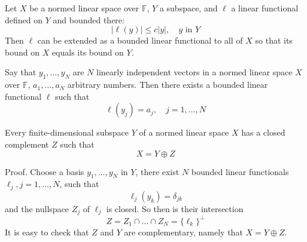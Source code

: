 \documentclass[12pt, oneside]{book}
\begin{document}
\begin{theorem}
    Let $X$ be a normed linear space over $\mathbb{F}$, $Y$ a subspace, and $\ell$ a linear functional defined on $Y$ and bounded there:
    \begin{equation*}
        |\ell(y)| \leq c|y|, \quad y \text { in } Y
    \end{equation*}
    Then $\ell$ can be extended as a bounded linear functional to all of $X$ so that its bound on $X$ equals its bound on $Y$.
\end{theorem}
\begin{theorem}
    Say that $y_1, \ldots, y_N$ are $N$ linearly independent vectors in a normed linear space $X$ over $\mathbb{F}$, $a_1, \ldots, a_N$ arbitrary numbers. Then there exists a bounded linear functional $\ell$ such that
    \begin{equation*}
        \ell\left(y_j\right)=a_j, \quad j=1, \ldots, N
    \end{equation*}
\end{theorem}
\begin{corollary}
    Every finite-dimensional subspace $Y$ of a normed linear space $X$ has a closed complement $Z$ such that
    \begin{equation*}
        X=Y \oplus Z
    \end{equation*}

    Proof. Choose a basis $y_1, \ldots, y_N$ in $Y$, there exist $N$ bounded linear functionals $\ell_j, j=1, \ldots, N$, such that
    \begin{equation*}
        \ell_j\left(y_k\right)=\delta_{j k}
    \end{equation*}
    and the nullspace $Z_j$ of $\ell_j$ is closed. So then is their intersection
    \begin{equation*}
        Z=Z_1 \cap \ldots \cap Z_N =\{\ell_k\}^{\bot }
    \end{equation*}
    It is easy to check that $Z$ and $Y$ are complementary, namely that $X=Y \oplus Z$.
\end{corollary}
\end{document}

